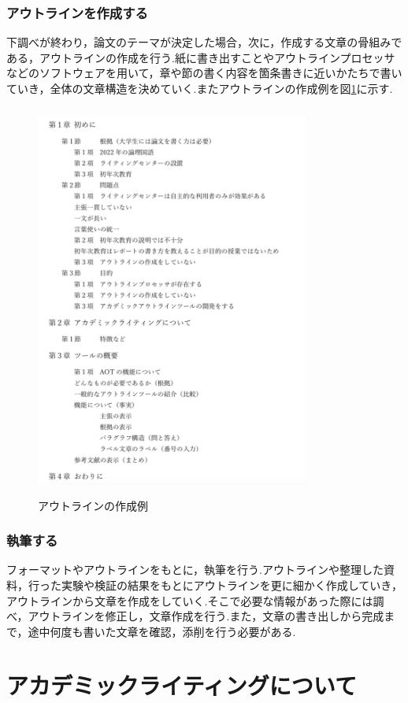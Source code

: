\documentclass[a4j,12pt]{jarticle}
\begin{document}
\subsubsection{アウトラインを作成する}
下調べが終わり，論文のテーマが決定した場合，次に，作成する文章の骨組みである，アウトラインの作成を行う.紙に書き出すことやアウトラインプロセッサなどのソフトウェアを用いて，章や節の書く内容を箇条書きに近いかたちで書いていき，全体の文章構造を決めていく.またアウトラインの作成例を図\ref{fig:a}に示す.
\begin{figure}[h]
\begin{center}
 \includegraphics[clip,width=90mm,height=130mm]{figure/outline2.png}
\end{center}
 \caption{アウトラインの作成例}
 \label{fig:a}
\end{figure}
\newpage
\subsubsection{執筆する}
フォーマットやアウトラインをもとに，執筆を行う.アウトラインや整理した資料，行った実験や検証の結果をもとにアウトラインを更に細かく作成していき，アウトラインから文章を作成をしていく.そこで必要な情報があった際には調べ，アウトラインを修正し，文章作成を行う.また，文章の書き出しから完成まで，途中何度も書いた文章を確認，添削を行う必要がある.
\newpage
\section{アカデミックライティングについて}
\end{document}

